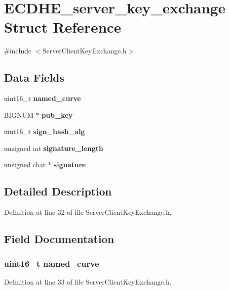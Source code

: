 \section{E\+C\+D\+H\+E\+\_\+server\+\_\+key\+\_\+exchange Struct Reference}
\label{struct_e_c_d_h_e__server__key__exchange}


{\ttfamily \#include $<$Server\+Client\+Key\+Exchange.\+h$>$}

\subsection*{Data Fields}
\begin{DoxyCompactItemize}
\item 
uint16\+\_\+t {\bf named\+\_\+curve}
\item 
B\+I\+G\+N\+UM $\ast$ {\bf pub\+\_\+key}
\item 
uint16\+\_\+t {\bf sign\+\_\+hash\+\_\+alg}
\item 
unsigned int {\bf signature\+\_\+length}
\item 
unsigned char $\ast$ {\bf signature}
\end{DoxyCompactItemize}


\subsection{Detailed Description}


Definition at line 32 of file Server\+Client\+Key\+Exchange.\+h.



\subsection{Field Documentation}
\subsubsection[{named\+\_\+curve}]{\setlength{\rightskip}{0pt plus 5cm}uint16\+\_\+t named\+\_\+curve}\label{struct_e_c_d_h_e__server__key__exchange_a5754cc60d6f7a74a313db0e4bc607b07}


Definition at line 33 of file Server\+Client\+Key\+Exchange.\+h.

